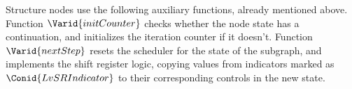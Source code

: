 \resethooks

Structure nodes use the following auxiliary functions, already mentioned
above. Function \ensuremath{\Varid{initCounter}} checks whether the node state has a
continuation, and initializes the iteration counter if it doesn't. Function
\ensuremath{\Varid{nextStep}} resets the scheduler for the state of the subgraph, and implements
the shift register logic, copying values from indicators marked as
\ensuremath{\Conid{LvSRIndicator}} to their corresponding controls in the new state.


